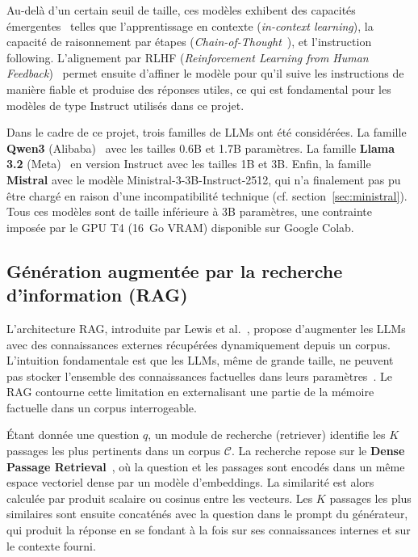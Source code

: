 \documentclass[12pt,a4paper]{article}
\begin{document}
Au-del\`a d'un certain seuil de taille, ces mod\`eles exhibent des capacit\'es \'emergentes~\cite{wei2022emergent} telles que l'apprentissage en contexte (\textit{in-context learning}), la capacit\'e de raisonnement par \'etapes (\textit{Chain-of-Thought}~\cite{wei_chain--thought_2022}), et l'instruction following. L'alignement par RLHF (\textit{Reinforcement Learning from Human Feedback})~\cite{ouyang2022training} permet ensuite d'affiner le mod\`ele pour qu'il suive les instructions de mani\`ere fiable et produise des r\'eponses utiles, ce qui est fondamental pour les mod\`eles de type Instruct utilis\'es dans ce projet.

Dans le cadre de ce projet, trois familles de LLMs ont \'et\'e consid\'er\'ees. La famille \textbf{Qwen3} (Alibaba)~\cite{yang2025qwen3} avec les tailles 0.6B et 1.7B param\`etres. La famille \textbf{Llama 3.2} (Meta)~\cite{meta2024llama32} en version Instruct avec les tailles 1B et 3B. Enfin, la famille \textbf{Mistral} avec le mod\`ele Ministral-3-3B-Instruct-2512, qui n'a finalement pas pu \^etre charg\'e en raison d'une incompatibilit\'e technique (cf. section~\ref{sec:ministral}). Tous ces mod\`eles sont de taille inf\'erieure \`a 3B param\`etres, une contrainte impos\'ee par le GPU T4 (16~Go VRAM) disponible sur Google Colab.

\subsection{G\'en\'eration augment\'ee par la recherche d'information (RAG)}

L'architecture RAG, introduite par Lewis et al.~\cite{lewis2020retrieval}, propose d'augmenter les LLMs avec des connaissances externes r\'ecup\'er\'ees dynamiquement depuis un corpus. L'intuition fondamentale est que les LLMs, m\^eme de grande taille, ne peuvent pas stocker l'ensemble des connaissances factuelles dans leurs param\`etres~\cite{petroni2019language}. Le RAG contourne cette limitation en externalisant une partie de la m\'emoire factuelle dans un corpus interrogeable.

\'Etant donn\'ee une question $q$, un module de recherche (retriever) identifie les $K$ passages les plus pertinents dans un corpus $\mathcal{C}$. La recherche repose sur le \textbf{Dense Passage Retrieval}~\cite{karpukhin2020dense}, o\`u la question et les passages sont encod\'es dans un m\^eme espace vectoriel dense par un mod\`ele d'embeddings. La similarit\'e est alors calcul\'ee par produit scalaire ou cosinus entre les vecteurs. Les $K$ passages les plus similaires sont ensuite concat\'en\'es avec la question dans le prompt du g\'en\'erateur, qui produit la r\'eponse en se fondant \`a la fois sur ses connaissances internes et sur le contexte fourni.
\end{document}
